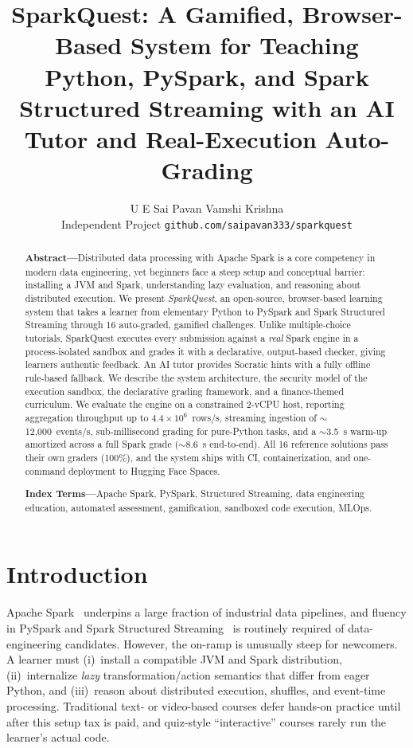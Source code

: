 \documentclass[10pt,twocolumn,letterpaper]{article}
\title{\vspace{-2.0em}\textbf{\large SparkQuest: A Gamified, Browser-Based System for
Teaching Python, PySpark, and Spark Structured Streaming with an AI Tutor and
Real-Execution Auto-Grading}}
\author{
  U E Sai Pavan Vamshi Krishna\\
  \small Independent Project \quad\textbar\quad \texttt{github.com/saipavan333/sparkquest}
}
\date{}
\begin{document}
\maketitle

\begin{abstract}
\noindent\textbf{Abstract---}Distributed data processing with Apache Spark is a
core competency in modern data engineering, yet beginners face a steep setup and
conceptual barrier: installing a JVM and Spark, understanding lazy evaluation, and
reasoning about distributed execution. We present \emph{SparkQuest}, an open-source,
browser-based learning system that takes a learner from elementary Python to
PySpark and Spark Structured Streaming through 16 auto-graded, gamified challenges.
Unlike multiple-choice tutorials, SparkQuest executes every submission against a
\emph{real} Spark engine in a process-isolated sandbox and grades it with a
declarative, output-based checker, giving learners authentic feedback. An AI tutor
provides Socratic hints with a fully offline rule-based fallback. We describe the
system architecture, the security model of the execution sandbox, the declarative
grading framework, and a finance-themed curriculum. We evaluate the engine on a
constrained 2-vCPU host, reporting aggregation throughput up to
$4.4\times10^{6}$~rows/s, streaming ingestion of $\sim$12{,}000~events/s,
sub-millisecond grading for pure-Python tasks, and a $\sim$3.5~s warm-up amortized
across a full Spark grade ($\sim$8.6~s end-to-end). All 16 reference solutions pass
their own graders (100\%), and the system ships with CI, containerization, and
one-command deployment to Hugging Face Spaces.

\smallskip
\noindent\textbf{Index Terms---}Apache Spark, PySpark, Structured Streaming, data
engineering education, automated assessment, gamification, sandboxed code
execution, MLOps.
\end{abstract}

\section{Introduction}
Apache Spark~\cite{zaharia2016spark} underpins a large fraction of industrial data
pipelines, and fluency in PySpark and Spark Structured
Streaming~\cite{armbrust2018streaming} is routinely required of data-engineering
candidates. However, the on-ramp is unusually steep for newcomers. A learner must
(i)~install a compatible JVM and Spark distribution, (ii)~internalize \emph{lazy}
transformation/action semantics that differ from eager Python, and (iii)~reason
about distributed execution, shuffles, and event-time processing. Traditional
text- or video-based courses defer hands-on practice until after this setup tax is
paid, and quiz-style ``interactive'' courses rarely run the learner's actual code.
\end{document}
